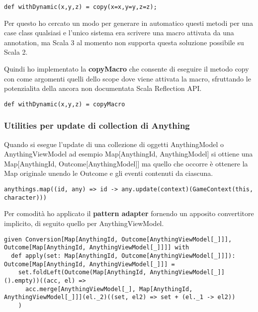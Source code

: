 \begin{lstlisting}[basicstyle=\tiny]
def withDynamic(x,y,z) = copy(x=x,y=y,z=z); 
\end{lstlisting}

Per questo ho cercato un modo per generare in automatico questi metodi per una case class qualsiasi e l'unico sistema era scrivere una macro attivata da una annotation, ma Scala 3 al momento non supporta questa soluzione possibile su Scala 2.

Quindi ho implementato la \textbf{copyMacro} che consente di eseguire il metodo copy con come argomenti quelli dello scope dove viene attivata la macro, sfruttando le potenzialita della ancora non documentata Scala Reflection API. 

\begin{lstlisting}[basicstyle=\tiny]
def withDynamic(x,y,z) = copyMacro
\end{lstlisting}

\subsubsection{Utilities per update di collection di Anything}

Quando si esegue l'update di una collezione di oggetti AnythingModel o AnythingViewModel ad esempio Map[AnythingId, AnythingModel] si ottiene una Map[AnythingId, Outcome[AnythingModel]] ma quello che occorre è ottenere la Map originale unendo le Outcome e gli eventi contenuti da ciascuna.

\begin{lstlisting}[basicstyle=\tiny]
anythings.map((id, any) => id -> any.update(context)(GameContext(this, character)))
\end{lstlisting}

Per comodità ho applicato il \textbf{pattern adapter} fornendo un apposito convertitore implicito, di seguito quello per AnythingViewModel.

\begin{lstlisting}[basicstyle=\tiny]
given Conversion[Map[AnythingId, Outcome[AnythingViewModel[_]]], Outcome[Map[AnythingId, AnythingViewModel[_]]]] with
  def apply(set: Map[AnythingId, Outcome[AnythingViewModel[_]]]): Outcome[Map[AnythingId, AnythingViewModel[_]]] =
    set.foldLeft(Outcome(Map[AnythingId, AnythingViewModel[_]]().empty))((acc, el) =>
      acc.merge[AnythingViewModel[_], Map[AnythingId, AnythingViewModel[_]]](el._2)((set, el2) => set + (el._1 -> el2))
    )
\end{lstlisting}